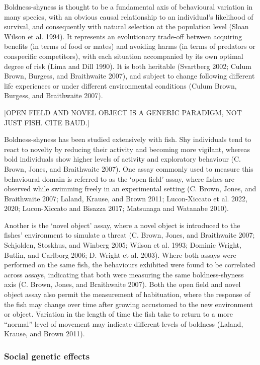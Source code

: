 \documentclass[
]{book}
\begin{document}
Boldness-shyness is thought to be a fundamental axis of behavioural variation in many species, with an obvious causal relationship to an individual's likelihood of survival, and consequently with natural selection at the population level (Sloan Wilson et al. 1994). It represents an evolutionary trade-off between acquiring benefits (in terms of food or mates) and avoiding harms (in terms of predators or conspecific competitors), with each situation accompanied by its own optimal degree of risk (Lima and Dill 1990). It is both heritable (Svartberg 2002; Culum Brown, Burgess, and Braithwaite 2007), and subject to change following different life experiences or under different environmental conditions (Culum Brown, Burgess, and Braithwaite 2007).

{[}OPEN FIELD AND NOVEL OBJECT IS A GENERIC PARADIGM, NOT JUST FISH. CITE BAUD.{]}

Boldness-shyness has been studied extensively with fish. Shy individuals tend to react to novelty by reducing their activity and becoming more vigilant, whereas bold individuals show higher levels of activity and exploratory behaviour (C. Brown, Jones, and Braithwaite 2007). One assay commonly used to measure this behavioural domain is referred to as the `open field' assay, where fishes are observed while swimming freely in an experimental setting (C. Brown, Jones, and Braithwaite 2007; Laland, Krause, and Brown 2011; Lucon-Xiccato et al. 2022, 2020; Lucon-Xiccato and Bisazza 2017; Matsunaga and Watanabe 2010).

Another is the `novel object' assay, where a novel object is introduced to the fishes' environment to simulate a threat (C. Brown, Jones, and Braithwaite 2007; Schjolden, Stoskhus, and Winberg 2005; Wilson et al. 1993; Dominic Wright, Butlin, and Carlborg 2006; D. Wright et al. 2003). Where both assays were performed on the same fish, the behaviours exhibited were found to be correlated across assays, indicating that both were measuring the same boldness-shyness axis (C. Brown, Jones, and Braithwaite 2007). Both the open field and novel object assay also permit the measurement of habituation, where the response of the fish may change over time after growing accustomed to the new environment or object. Variation in the length of time the fish take to return to a more ``normal'' level of movement may indicate different levels of boldness (Laland, Krause, and Brown 2011).

\hypertarget{social-genetic-effects}{%
\subsubsection{Social genetic effects}\label{social-genetic-effects}}
\end{document}

